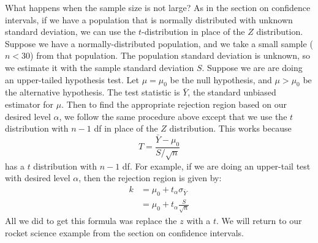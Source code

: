 \documentclass[12pt]{article}
\theoremstyle{definition}
\theoremstyle{remark}
\begin{document}
What happens when the sample size is not large? As in the section on confidence intervals, if we have a population that is normally distributed with unknown standard deviation, we can use the $t$-distribution in place of the $Z$ distribution. Suppose we have a normally-distributed population, and we take a small sample ($n < 30$) from that population. The population standard deviation is unknown, so we estimate it with the sample standard deviation $S$. Suppose we are are doing an upper-tailed hypothesis test. Let $\mu = \mu_0$ be the null hypothesis, and $\mu > \mu_0$ be the alternative hypothesis. The test statistic is $\bar{Y}$, the standard unbiased estimator for $\mu$. Then to find the appropriate rejection region based on our desired level $\alpha$, we follow the same procedure above except that we use the $t$ distribution with $n-1$ df in place of the $Z$ distribution. This works because
\[
T = \frac{ \bar{Y} - \mu_0}{S/\sqrt{n}}
\]
has a $t$ distribution with $n-1$ df. For example, if we are doing an upper-tail test with desired level $\alpha$, then the rejection region is given by:
\begin{align*}
k &= \mu_0 + t_\alpha \sigma_{\bar{Y}}\\
&= \mu_0 + t_\alpha \frac{S}{\sqrt{n}}
\end{align*}
All we did to get this formula was replace the $z$ with a $t$. We will return to our rocket science example from the section on confidence intervals.
\end{document}
